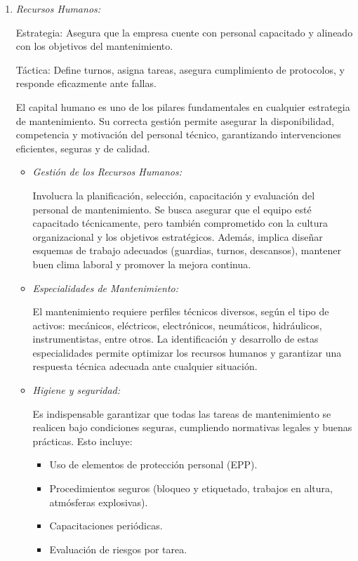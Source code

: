 \documentclass[a4paper,oneside,11pt]{article}
\begin{document}
\begin{enumerate}
    \item \textit{Recursos Humanos:}
    
    Estrategia: Asegura que la empresa cuente con personal capacitado y alineado con los objetivos del mantenimiento.

    Táctica: Define turnos, asigna tareas, asegura cumplimiento de protocolos, y responde eficazmente ante fallas.  

    El capital humano es uno de los pilares fundamentales en cualquier estrategia de mantenimiento. Su correcta gestión permite asegurar la disponibilidad, competencia y motivación del personal técnico, garantizando intervenciones eficientes, seguras y de calidad.

    \begin{itemize}
        \item \textit{Gestión de los Recursos Humanos:}
        
        Involucra la planificación, selección, capacitación y evaluación del personal de mantenimiento. Se busca asegurar que el equipo esté capacitado técnicamente, pero también comprometido con la cultura organizacional y los objetivos estratégicos. Además, implica diseñar esquemas de trabajo adecuados (guardias, turnos, descansos), mantener buen clima laboral y promover la mejora continua.
        
        \item \textit{Especialidades de Mantenimiento:}

        El mantenimiento requiere perfiles técnicos diversos, según el tipo de activos: mecánicos, eléctricos, electrónicos, neumáticos, hidráulicos, instrumentistas, entre otros. La identificación y desarrollo de estas especialidades permite optimizar los recursos humanos y garantizar una respuesta técnica adecuada ante cualquier situación.
        
        \item \textit{Higiene y seguridad:}

        Es indispensable garantizar que todas las tareas de mantenimiento se realicen bajo condiciones seguras, cumpliendo normativas legales y buenas prácticas. Esto incluye:

        \begin{itemize}
            \item Uso de elementos de protección personal (EPP).
            \item Procedimientos seguros (bloqueo y etiquetado, trabajos en altura, atmósferas explosivas).
            \item Capacitaciones periódicas.
            \item Evaluación de riesgos por tarea.
        \end{itemize}


\end{itemize}
\end{enumerate}
\end{document}
